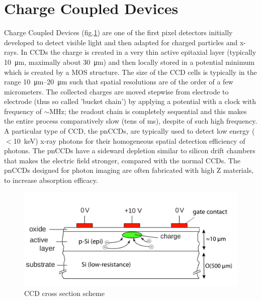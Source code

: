     
\section{Charge Coupled Devices}
   Charge Coupled Devices (fig.\ref{fig:CCD_scheme}) are one of the first pixel detectors initially developed to detect visible light and then adapted for charged particles and x-rays. 
   In CCDs the charge is created in a very thin active epitaxial layer (typically \SI{10}{\um}, maximally about \SI{30}{\um}) and then locally stored in a potential minimum which is created by a MOS structure. 
   The size of the CCD cells is typically in the range \SIrange{10}{20}{\um} such that spatial resolutions are of the order of a few micrometers.
   The collected charges are moved stepwise from electrode to electrode (thus so called 'bucket chain') by applying a potential with a clock with frequency of $\sim$\si{MHz}; the readout chain is completely sequential and this makes the entire process comparatively slow (tens of \si{ms}), despite of such high frequency.
   A particular type of CCD, the pnCCDs, are typically used to detect low energy ($<$\SI{10}{keV}) x-ray photons for their homogeneous spatial detection efficiency of photons. The pnCCDs have a sideward depletion similar to silicon drift chambers that makes the electric field stronger, compared with the normal CCDs. 
   The pnCCDs designed for photon imaging are often fabricated with high Z materials, to increase absorption efficacy.
   \begin{figure}
      \centering
          \includegraphics[width=\linewidth]{figures/Pixel_detectors/CCD.png}
          \caption{CCD cross section scheme}
          \label{fig:CCD_scheme}
   \end{figure}



